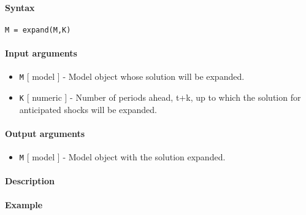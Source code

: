 


	\paragraph{Syntax}\label{syntax}

\begin{verbatim}
M = expand(M,K)
\end{verbatim}

\paragraph{Input arguments}\label{input-arguments}

\begin{itemize}
\item
  \texttt{M} {[} model {]} - Model object whose solution will be
  expanded.
\item
  \texttt{K} {[} numeric {]} - Number of periods ahead, t+k, up to which
  the solution for anticipated shocks will be expanded.
\end{itemize}

\paragraph{Output arguments}\label{output-arguments}

\begin{itemize}
\itemsep1pt\parskip0pt
\item
  \texttt{M} {[} model {]} - Model object with the solution expanded.
\end{itemize}

\paragraph{Description}\label{description}

\paragraph{Example}\label{example}


